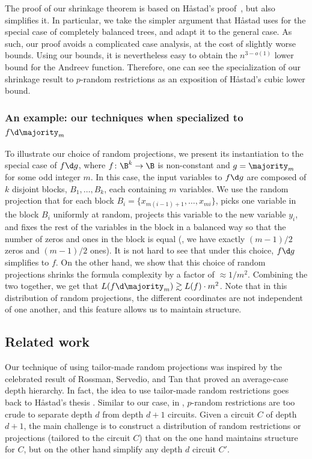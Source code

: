 \documentclass{toc}
\begin{document}
The proof of our shrinkage theorem is based on H{\aa}stad's proof~\cite{H98},
but also simplifies it. In particular, we take the simpler argument
that H{\aa}stad uses for the special case of completely balanced
trees, and adapt it to the general case. As such, our proof avoids
a complicated case analysis, at the cost of slightly worse bounds.
Using our bounds, it is nevertheless easy to obtain the $n^{3-o(1)}$
lower bound for the Andreev function. Therefore, one can see the specialization
of our shrinkage result to $p$-random restrictions as an exposition
of H{\aa}stad's cubic lower bound.

%
\subsubsection{An example: our techniques when specialized to $f\protect\d\protect\majority_{m}$}   %

To illustrate our choice of random projections, we present its instantiation
to the special case of $f\d g$, where $f\colon\B^{k}\to\B$ is non-constant
and $g=\majority_{m}$ for some odd integer $m$. In this case, the
input variables to $f\d g$ are composed of $k$ disjoint blocks,
$B_{1},\ldots,B_{k}$, each containing $m$ variables. We use the
random projection that for each block $B_{i}=\{x_{m(i-1)+1},\ldots,x_{mi}\}$,
picks one variable in the block $B_{i}$ uniformly at random, projects
this variable to the new variable $y_{i}$, and fixes the rest of
the variables in the block in a balanced way so that the number of
zeros and ones in the block is equal (\ie, we have exactly $(m-1)/2$
zeros and $(m-1)/2$ ones). It is not hard to see that under this
choice, $f\d g$ simplifies to $f$. On the other hand, we show that
this choice of random projections shrinks the formula complexity by
a factor of $\approx1/m^{2}$. Combining the two together, we get
that $L(f\d\majority_{m})\gtrsim L(f)\cdot m^{2}$. Note that in this
distribution of random projections, the different coordinates are
not independent of one another, and this feature allows us to maintain
structure.

\subsection{Related work}

Our technique of using tailor-made random projections was inspired
by the celebrated result of Rossman, Servedio, and Tan
%
\cite{HRST17}   %
that proved an average-case depth hierarchy. In fact, the idea to
use tailor-made random restrictions goes back to H{\aa}stad's thesis
\cite[Chapter~6.2]{H87}. Similar to our case, in
%
\cite{H87,HRST17},  %
$p$-random restrictions are too crude to separate depth $d$ from
depth $d+1$ circuits. Given a circuit $C$ of depth $d+1$, the main
challenge is to construct a distribution of random restrictions or
projections (tailored to the circuit $C$) that on the one hand maintains
structure for $C$, but on the other hand simplify any depth $d$
circuit $C'$.
\end{document}
